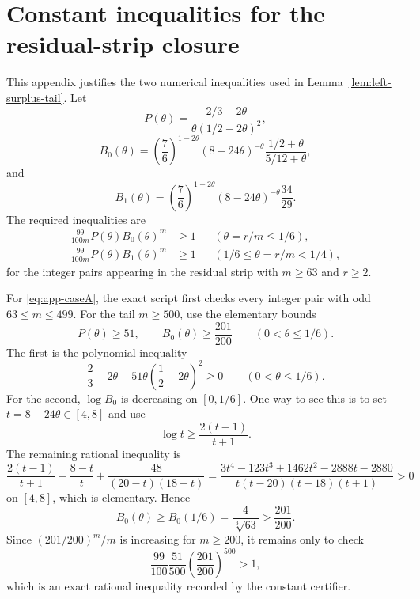 \documentclass[11pt]{article}
\begin{document}
\appendix
\section{Constant inequalities for the residual-strip closure}\label{app:constants}

This appendix justifies the two numerical inequalities used in Lemma~\ref{lem:left-surplus-tail}.  Let
\[
        P(\theta)=\frac{2/3-2\theta}{\theta(1/2-2\theta)^2},
\]
\[
        B_0(\theta)=
        \left(\frac76\right)^{1-2\theta}
        (8-24\theta)^{-\theta}
        \frac{1/2+\theta}{5/12+\theta},
\]
and
\[
        B_1(\theta)=
        \left(\frac76\right)^{1-2\theta}
        (8-24\theta)^{-\theta}
        \frac{34}{29}.
\]
The required inequalities are
\begin{align}
        \frac{99}{100m}P(\theta)B_0(\theta)^m&\ge1
        &&(\theta=r/m\le1/6),\label{eq:app-caseA}\\
        \frac{99}{100m}P(\theta)B_1(\theta)^m&\ge1
        &&(1/6\le\theta=r/m<1/4),\label{eq:app-caseB}
\end{align}
for the integer pairs appearing in the residual strip with $m\ge63$ and $r\ge2$.

For \eqref{eq:app-caseA}, the exact script first checks every integer pair with odd $63\le m\le499$.  For the tail $m\ge500$, use the elementary bounds
\[
        P(\theta)\ge51,
        \qquad
        B_0(\theta)\ge\frac{201}{200}
        \qquad(0<\theta\le1/6).
\]
The first is the polynomial inequality
\[
        \frac23-2\theta-51\theta\left(\frac12-2\theta\right)^2\ge0
        \qquad(0<\theta\le1/6).
\]
For the second, $\log B_0$ is decreasing on $[0,1/6]$.  One way to see this is to set $t=8-24\theta\in[4,8]$ and use
\[
        \log t\ge \frac{2(t-1)}{t+1}.
\]
The remaining rational inequality is
\[
\frac{2(t-1)}{t+1}-\frac{8-t}{t}+\frac{48}{(20-t)(18-t)}
=\frac{3t^4-123t^3+1462t^2-2888t-2880}{t(t-20)(t-18)(t+1)}>0
\]
on $[4,8]$, which is elementary.  Hence
\[
        B_0(\theta)\ge B_0(1/6)=\frac{4}{\sqrt[3]{63}}>\frac{201}{200}.
\]
Since $(201/200)^m/m$ is increasing for $m\ge200$, it remains only to check
\[
        \frac{99}{100}\frac{51}{500}\left(\frac{201}{200}\right)^{500}>1,
\]
which is an exact rational inequality recorded by the constant certifier.
\end{document}
